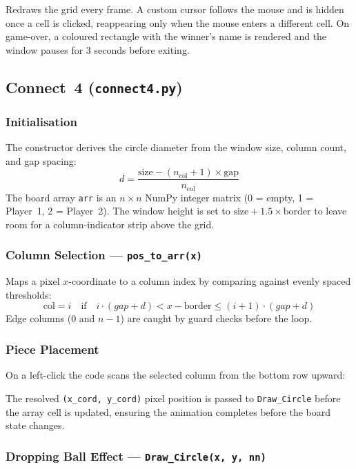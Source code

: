 \documentclass[12pt]{article}
\begin{document}
Redraws the grid every frame. A custom cursor follows the mouse and is hidden once a cell is clicked, reappearing only when the mouse enters a different cell. On game-over, a coloured rectangle with the winner's name is rendered and the window pauses for 3 seconds before exiting.
 
\subsection{Connect~4 (\texttt{connect4.py})}
 
\subsubsection{Initialisation}
 
The constructor derives the circle diameter from the window size, column count, and gap spacing:
\[
d = \frac{\text{size} - (n_{\text{col}}+1) \times \text{gap}}{n_{\text{col}}}
\]
The board array \texttt{arr} is an $n \times n$ NumPy integer matrix (0 = empty, 1 = Player~1, 2 = Player~2). The window height is set to $\text{size} + 1.5 \times \text{border}$ to leave room for a column-indicator strip above the grid.
 
\subsubsection{Column Selection --- \texttt{pos\_to\_arr(x)}}
 
Maps a pixel $x$-coordinate to a column index by comparing against evenly spaced thresholds:
\[
\text{col} = i \quad \text{if} \quad i \cdot (gap + d) < x - \text{border} \leq (i+1) \cdot (gap + d)
\]
Edge columns (0 and $n-1$) are caught by guard checks before the loop.
 
\subsubsection{Piece Placement}
 
On a left-click the code scans the selected column from the bottom row upward:
 
The resolved \texttt{(x\_cord, y\_cord)} pixel position is passed to \texttt{Draw\_Circle} before the array cell is updated, ensuring the animation completes before the board state changes.
 
\subsubsection{Dropping Ball Effect --- \texttt{Draw\_Circle(x, y, nn)}}
 
\end{document}
